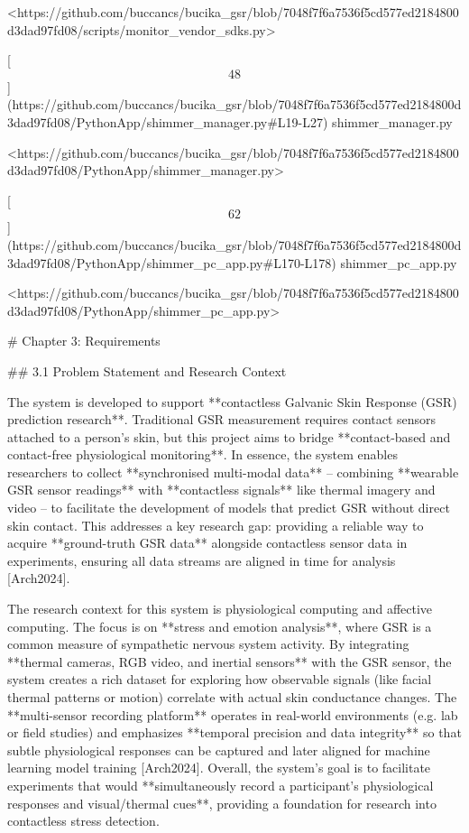 \documentclass[12pt,a4paper]{article}
\begin{document}
<https://github.com/buccancs/bucika_gsr/blob/7048f7f6a7536f5cd577ed2184800d3dad97fd08/scripts/monitor_vendor_sdks.py>

[\[48\]](https://github.com/buccancs/bucika_gsr/blob/7048f7f6a7536f5cd577ed2184800d3dad97fd08/PythonApp/shimmer_manager.py#L19-L27)
shimmer_manager.py

<https://github.com/buccancs/bucika_gsr/blob/7048f7f6a7536f5cd577ed2184800d3dad97fd08/PythonApp/shimmer_manager.py>

[\[62\]](https://github.com/buccancs/bucika_gsr/blob/7048f7f6a7536f5cd577ed2184800d3dad97fd08/PythonApp/shimmer_pc_app.py#L170-L178)
shimmer_pc_app.py

<https://github.com/buccancs/bucika_gsr/blob/7048f7f6a7536f5cd577ed2184800d3dad97fd08/PythonApp/shimmer_pc_app.py>


\newpage


# Chapter 3: Requirements

## 3.1 Problem Statement and Research Context

The system is developed to support **contactless Galvanic Skin Response
(GSR) prediction research**. Traditional GSR measurement requires
contact sensors attached to a person's skin, but this project aims to
bridge **contact-based and contact-free physiological monitoring**. In
essence, the system enables researchers to collect **synchronised
multi-modal data** -- combining **wearable GSR sensor readings** with
**contactless signals** like thermal imagery and video -- to facilitate
the development of models that predict GSR without direct skin contact.
This addresses a key research gap: providing a reliable way to acquire **ground-truth GSR data** alongside contactless sensor data in experiments, ensuring all data streams are aligned in time for analysis [Arch2024].

The research context for this system is physiological computing and
affective computing. The focus is on **stress and emotion analysis**,
where GSR is a common measure of sympathetic nervous system activity. By
integrating **thermal cameras, RGB video, and inertial sensors** with
the GSR sensor, the system creates a rich dataset for exploring how
observable signals (like facial thermal patterns or motion) correlate
with actual skin conductance changes. The **multi-sensor recording
platform** operates in real-world environments (e.g. lab or field
studies) and emphasizes **temporal precision and data integrity** so
that subtle physiological responses can be captured and later aligned
for machine learning model training [Arch2024].
Overall, the system's goal is to facilitate experiments that would
**simultaneously record a participant's physiological responses and
visual/thermal cues**, providing a foundation for research into
contactless stress detection.
\end{document}
